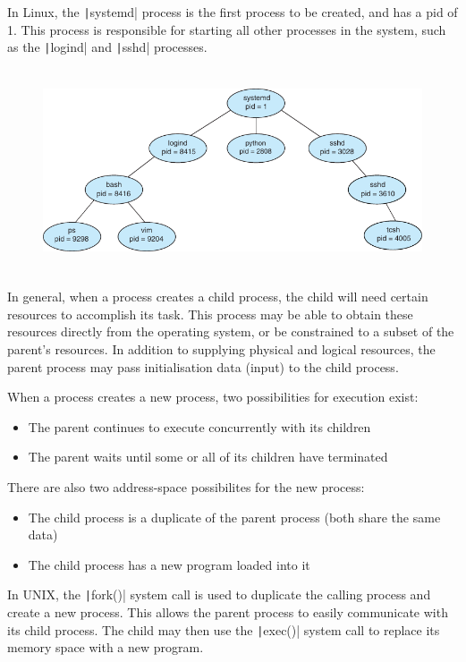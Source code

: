 \documentclass{article}
\begin{document}
In Linux, the \texttt|systemd| process is the first process
to be created, and has a pid of 1. This process is responsible for
starting all other processes in the system, such as the
\texttt|logind| and \texttt|sshd| processes.
\begin{figure}[H]
    \centering
    \includegraphics[height = 6cm]{figures/linux_process_tree.pdf}
\end{figure}
In general, when a process creates a child process, the child will
need certain resources to accomplish its task.
This process may be able to obtain these resources directly from the
operating system, or be constrained to a subset of the parent's
resources.
In addition to supplying physical and logical resources, the parent
process may pass initialisation data (input) to the child process.

When a process creates a new process, two possibilities for execution
exist:
\begin{itemize}
    \item The parent continues to execute concurrently with its
          children
    \item The parent waits until some or all of its children have
          terminated
\end{itemize}
There are also two address-space possibilites for
the new process:
\begin{itemize}
    \item The child process is a duplicate of the parent process (both
          share the same data)
    \item The child process has a new program loaded into it
\end{itemize}
In UNIX,
the \texttt|fork()| system call is used to
duplicate the calling process and create a new
process.
This allows the parent process to easily communicate with its child
process.
The child may then use the \texttt|exec()| system call to
replace its memory space with a new program.
\end{document}

